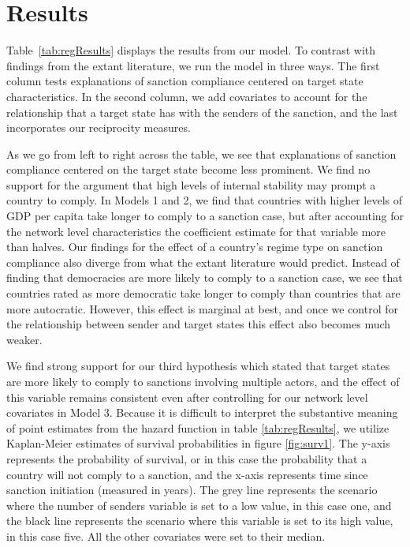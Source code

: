 \section*{Results}
\label{Results} 


\FloatBarrier

Table~\ref{tab:regResults} displays the results from our model. To contrast with findings from the extant literature, we run the model in three ways. The first column tests explanations of sanction compliance centered on target state characteristics. In the second column, we add covariates to account for the relationship that a target state has with the senders of the sanction, and the last incorporates our reciprocity measures. 

As we go from left to right across the table, we see that explanations of sanction compliance centered on the target state become less prominent. We find no support for the argument that high levels of internal stability may prompt a country to comply. In Models 1 and 2, we find that countries with higher levels of GDP per capita take longer to comply to a sanction case, but after accounting for the network level characteristics the coefficient estimate for that variable more than halves. Our findings for the effect of a country's regime type on sanction compliance also diverge from what the extant literature would predict. Instead of finding that democracies are more likely to comply to a sanction case, we see that countries rated as more democratic take longer to comply than countries that are more autocratic. However, this effect is marginal at best, and once we control for the relationship between sender and target states this effect also becomes much weaker. 

We find strong support for our third hypothesis which stated that target states are more likely to comply to sanctions involving multiple actors, and the effect of this variable remains consistent even after controlling for our network level covariates in Model 3. Because it is difficult to interpret the substantive meaning of point estimates from the hazard function in table \ref{tab:regResults}, we utilize Kaplan-Meier estimates of survival probabilities in figure \ref{fig:surv1}. The y-axis represents the probability of survival, or in this case the probability that a country will not comply to a sanction, and the x-axis represents time since sanction initiation (measured in years). The grey line represents the scenario where the number of senders variable is set to a low value, in this case one, and the black line represents the scenario where this variable is set to its high value, in this case five. All the other covariates were set to their median. 

